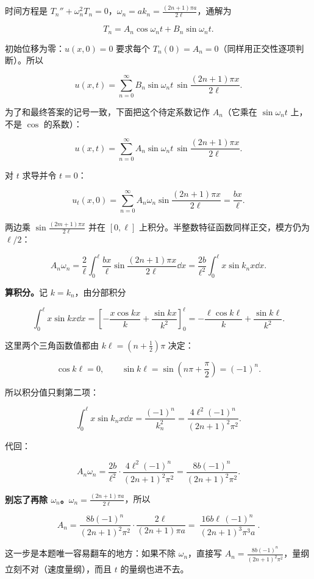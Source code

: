 
时间方程是 $T_n''+\omega_n^2T_n=0$，$\omega_n=ak_n=\frac{(2n+1)\pi a}{2\ell}$，通解为

\[
T_n=A_n\cos\omega_nt+B_n\sin\omega_nt .
\]

初始位移为零：$u(x,0)=0$ 要求每个 $T_n(0)=A_n=0$（同样用正交性逐项判断）。所以

\[
u(x,t)=\sum_{n=0}^{\infty}B_n\sin\omega_nt\,\sin\frac{(2n+1)\pi x}{2\ell}.
\]

为了和最终答案的记号一致，下面把这个待定系数记作 $A_n$（它乘在 $\sin\omega_nt$ 上，不是 $\cos$ 的系数）：

\[
u(x,t)=\sum_{n=0}^{\infty}A_n\sin\omega_nt\,\sin\frac{(2n+1)\pi x}{2\ell}.
\]


对 $t$ 求导并令 $t=0$：

\[
u_t(x,0)=\sum_{n=0}^{\infty}A_n\omega_n\sin\frac{(2n+1)\pi x}{2\ell}=\frac{bx}{\ell}.
\]

两边乘 $\sin\frac{(2m+1)\pi x}{2\ell}$ 并在 $[0,\ell]$ 上积分。半整数特征函数同样正交，模方仍为 $\ell/2$：

\[
A_n\omega_n=\frac{2}{\ell}\int_0^{\ell}\frac{bx}{\ell}\sin\frac{(2n+1)\pi x}{2\ell}\dd x
=\frac{2b}{\ell^2}\int_0^{\ell}x\sin k_nx\dd x .
\]

\textbf{算积分。}记 $k=k_n$，由分部积分

\[
\int_0^{\ell}x\sin kx\dd x
=\left[-\frac{x\cos kx}{k}+\frac{\sin kx}{k^2}\right]_0^{\ell}
=-\frac{\ell\cos k\ell}{k}+\frac{\sin k\ell}{k^2}.
\]

这里两个三角函数值都由 $k\ell=(n+\tfrac12)\pi$ 决定：

\[
\cos k\ell=0,
\qquad
\sin k\ell=\sin\left(n\pi+\frac{\pi}{2}\right)=(-1)^n .
\]

所以积分值只剩第二项：

\[
\int_0^{\ell}x\sin k_nx\dd x=\frac{(-1)^n}{k_n^2}
=\frac{4\ell^2(-1)^n}{(2n+1)^2\pi^2}.
\]

代回：

\[
A_n\omega_n=\frac{2b}{\ell^2}\cdot\frac{4\ell^2(-1)^n}{(2n+1)^2\pi^2}
=\frac{8b(-1)^n}{(2n+1)^2\pi^2}.
\]

\textbf{别忘了再除 $\omega_n$。}$\omega_n=\frac{(2n+1)\pi a}{2\ell}$，所以

\[
A_n=\frac{8b(-1)^n}{(2n+1)^2\pi^2}\cdot\frac{2\ell}{(2n+1)\pi a}
=\boxed{\ \frac{16b\ell\,(-1)^n}{(2n+1)^3\pi^3a}\ }.
\]

这一步是本题唯一容易翻车的地方：如果不除 $\omega_n$，直接写 $A_n=\frac{8b(-1)^n}{(2n+1)^2\pi^2}$，量纲立刻不对（速度量纲），而且 $t$ 的量纲也进不去。

